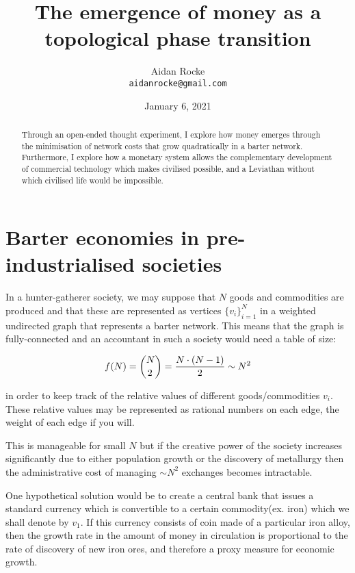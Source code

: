 \documentclass{article}
\title{The emergence of money as a topological phase transition}
\date{January 6, 2021}
\author{%
  Aidan Rocke\\
  \texttt{aidanrocke@gmail.com} \\
}
\begin{document}

\maketitle

\begin{abstract}
   Through an open-ended thought experiment, I explore how money 
   emerges through the minimisation of network costs that grow quadratically in a barter network. Furthermore, I explore how a monetary system allows the complementary development of commercial technology which makes civilised possible, and a Leviathan without which civilised life would be impossible. 
\end{abstract}

\section{Barter economies in pre-industrialised societies}

In a hunter-gatherer society, we may suppose that $N$ goods and commodities are produced
and that these are represented as vertices $\{v_i\}_{i=1}^N$ in a weighted undirected graph
that represents a barter network. This means that the graph is fully-connected and an
accountant in such a society would need a table of size:

\begin{equation}
f(N) = \\{N \choose 2 \\} = \frac{N \cdot (N-1)}{2} \sim N^2
\end{equation}

in order to keep track of the relative values of different goods/commodities $v_i$. These
relative values may be represented as rational numbers on each edge, the weight of each
edge if you will.

This is manageable for small $N$ but if the creative power of the society increases significantly due to either population growth or the discovery of metallurgy then the administrative cost of managing $\sim N^2$ exchanges becomes intractable.

One hypothetical solution would be to create a central bank that issues a standard currency
which is convertible to a certain commodity(ex. iron) which we shall denote by $v_1$. If
this currency consists of coin made of a particular iron alloy, then the growth rate in the
amount of money in circulation is proportional to the rate of discovery of new iron ores, and
therefore a proxy measure for economic growth.
\end{document}
